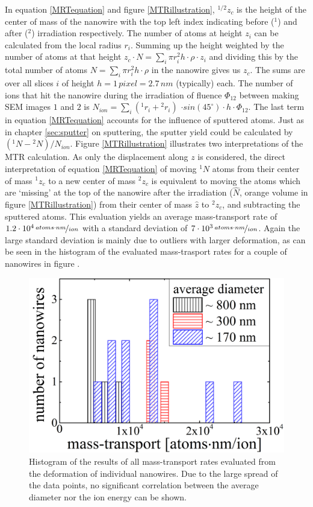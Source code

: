 In equation \ref{MRTequation} and figure \ref{MTRillustration}, ${}^{1/2}z_{c}$ is the height of the center of mass of the nanowire with the top left index indicating before ($^1$) and after ($^2$) irradiation respectively. The number of atoms at height $z_i$ can be calculated from the local radius $r_i$. Summing up the height weighted by the number of atoms at that height $z_{c} \cdot N = \sum_i{\pi r_i^2 h \cdot \rho \cdot z_i}$ and dividing this by the total number of atoms $N = \sum_i{\pi r_i^2 h \cdot \rho}$ in the nanowire gives us $z_{c}$. The sums are over all slices $i$ of height $h = 1\,pixel = 2.7\,nm$ (typically) each. The number of ions that hit the nanowire during the irradiation of fluence $\Phi_{12}$ between making SEM images $1$ and $2$ is $N_{ion} = \sum_i{({}^{1}r_i+{}^{2}r_i)}$ $\cdot sin(45^\circ) \cdot h \cdot \Phi_{12}$. The last term in equation \ref{MRTequation} accounts for the influence of sputtered atoms. Just as in chapter \ref{sec:sputter} on sputtering, the sputter yield could be calculated by $({}^{1}N - {}^{2}N)/N_{ion}$. Figure \ref{MTRillustration} illustrates two interpretations of the MTR calculation. As only the displacement along $z$ is considered, the direct interpretation of equation \ref{MRTequation} of moving ${}^{1}N$ atoms from their center of mass ${}^{1}z_{c}$ to a new center of mass ${}^{2}z_{c}$ is equivalent to moving the atoms which are `missing' at the top of the nanowire after the irradiation ($\hat{N}$, orange volume in figure \ref{MTRillustration}) from their center of mass $\hat{z}$ to ${}^{2}z_{c}$, and subtracting the sputtered atoms. This evaluation yields an average mass-transport rate of $1.2\cdot10^4 \,\nicefrac{atoms \cdot nm}{ion}$ with a standard deviation of $7\cdot 10^3\,\nicefrac{atoms \cdot nm}{ion}$. Again the large standard deviation is mainly due to outliers with larger deformation, as can be seen in the histogram of the evaluated mass-trasport rates for a couple of nanowires in figure \cite{MTReval}.

\begin{figure}
	\centering
		\includegraphics[width=.5\textwidth]{images/MTReval.png}
	\caption{Histogram of the results of all mass-transport rates evaluated from the deformation of individual nanowires. Due to the large spread of the data points, no significant correlation between the average diameter nor the ion energy can be shown.}
	\label{MTReval}
\end{figure}



